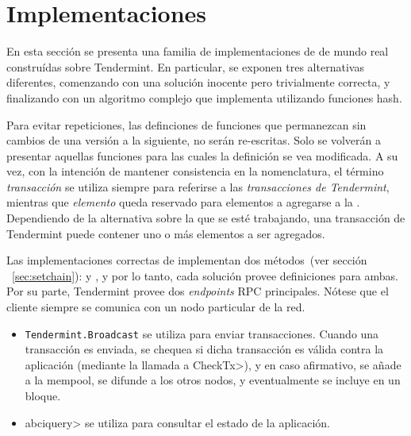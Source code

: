 \section{Implementaciones}\label{sec:impl}

En esta sección se presenta una familia de implementaciones de \setchain de mundo
real construídas sobre Tendermint.
%
En particular, se exponen tres alternativas diferentes, comenzando con una
solución inocente pero trivialmente correcta, y finalizando con un algoritmo
complejo que implementa \setchain utilizando funciones hash.
%

Para evitar repeticiones, las definciones de funciones que permanezcan sin cambios
de una versión a la siguiente, no serán re-escritas.
Solo se volverán a presentar aquellas funciones para las cuales la definición se
vea modificada.
%
A su vez, con la intención de mantener consistencia en la nomenclatura,
el término \textit{transacción} se utiliza siempre para referirse a las
\textit{transacciones de Tendermint}, mientras
que \textit{elemento} queda reservado para elementos a agregarse a la \setchain.
%
Dependiendo de la alternativa sobre la que se esté trabajando, una transacción de
Tendermint puede contener uno o más elementos a ser agregados.
%

Las implementaciones correctas de \setchain implementan dos métodos~(ver sección
~\ref{sec:setchain}): \Add y \Get, y por lo tanto, cada solución provee definiciones
para ambas.
%
Por su parte, Tendermint provee dos \textit{endpoints} RPC principales.
Nótese que el cliente siempre se comunica con un nodo particular de la red.
\begin{itemize}
  \item \texttt{Tendermint.Broadcast} se utiliza para enviar transacciones.
  Cuando una transacción es enviada, se chequea si dicha transacción
  es válida contra la aplicación (mediante la llamada a \<CheckTx>), y en caso
  afirmativo, se añade
  a la mempool, se difunde a los otros nodos, y eventualmente se incluye en
  un bloque.
  \item \<abciquery> se utiliza para consultar el estado de la
  aplicación.
\end{itemize}
%


